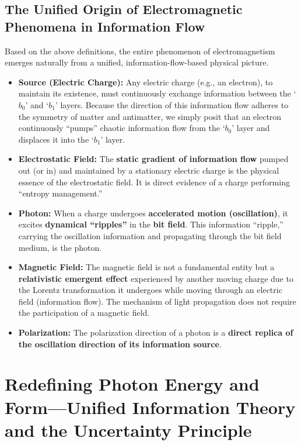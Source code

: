 \documentclass[11pt, a4paper]{article}
\begin{document}
\subsection{The Unified Origin of Electromagnetic Phenomena in Information Flow}

Based on the above definitions, the entire phenomenon of electromagnetism emerges naturally from a unified, information-flow-based physical picture.

\begin{itemize}
    \item \textbf{Source (Electric Charge):} Any electric charge (e.g., an electron), to maintain its existence, must continuously exchange information between the `$b_0$' and `$b_1$' layers. Because the direction of this information flow adheres to the symmetry of matter and antimatter, we simply posit that an electron continuously ``pumps'' chaotic information flow from the `$b_0$' layer and displaces it into the `$b_1$' layer.

    \item \textbf{Electrostatic Field:} The \textbf{static gradient of information flow} pumped out (or in) and maintained by a stationary electric charge is the physical essence of the electrostatic field. It is direct evidence of a charge performing ``entropy management.''

    \item \textbf{Photon:} When a charge undergoes \textbf{accelerated motion (oscillation)}, it excites \textbf{dynamical ``ripples''} in the \textbf{bit field}. This information ``ripple,'' carrying the oscillation information and propagating through the bit field medium, is the photon.

    \item \textbf{Magnetic Field:} The magnetic field is not a fundamental entity but a \textbf{relativistic emergent effect} experienced by another moving charge due to the Lorentz transformation it undergoes while moving through an electric field (information flow). The mechanism of light propagation does not require the participation of a magnetic field.

    \item \textbf{Polarization:} The polarization direction of a photon is a \textbf{direct replica of the oscillation direction of its information source}.
\end{itemize}

\section{Redefining Photon Energy and Form---Unified Information Theory and the Uncertainty Principle}
\end{document}
